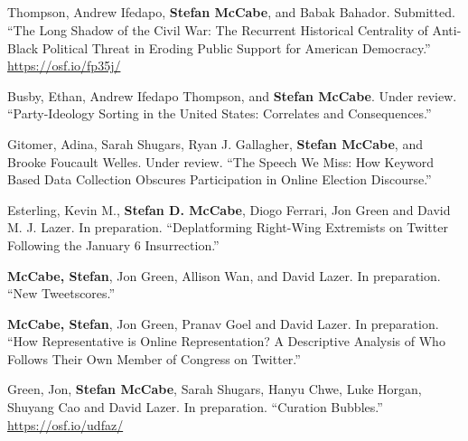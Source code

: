 \documentclass[11pt, letter]{article}
\begin{document}
\subsection*{} %
\vspace{-6mm} %
\begin{hangparas}{.25in}{1}

Thompson, Andrew Ifedapo, \textbf{Stefan McCabe}, and Babak Bahador.
Submitted. ``The Long Shadow of the Civil War: The Recurrent Historical Centrality of
Anti-Black Political Threat in Eroding Public Support for American Democracy.''
\href{https://osf.io/fp35j/}{https://osf.io/fp35j/} \vspace{2mm}

Busby, Ethan, Andrew Ifedapo Thompson, and \textbf{Stefan McCabe}. Under review.
``Party-Ideology Sorting in the United States: Correlates and Consequences.'' \vspace{2mm}

Gitomer, Adina, Sarah Shugars, Ryan J. Gallagher, \textbf{Stefan McCabe}, and
Brooke Foucault Welles. Under review. ``The Speech We Miss: How Keyword Based
Data Collection Obscures Participation in Online Election Discourse.'' \vspace{2mm}

Esterling, Kevin M.,\textsuperscript{\textdagger} \textbf{Stefan D.
McCabe},\textsuperscript{\textdagger} Diogo Ferrari, Jon Green and David M. J.
Lazer. In preparation. ``Deplatforming Right-Wing Extremists on Twitter
Following the January 6 Insurrection.''\vspace{2mm}

\textbf{McCabe, Stefan}, Jon Green, Allison Wan, and David Lazer. In
preparation. ``New Tweetscores.''\vspace{2mm}

\textbf{McCabe, Stefan}, Jon Green, Pranav Goel and David Lazer. In preparation.
``How Representative is Online Representation? A Descriptive Analysis of Who
Follows Their Own Member of Congress on Twitter.''\vspace{2mm}

Green, Jon,\textsuperscript{\textdagger} \textbf{Stefan
  McCabe},\textsuperscript{\textdagger} Sarah Shugars, Hanyu
Chwe, Luke Horgan, Shuyang Cao and David Lazer. In preparation. ``Curation
Bubbles.'' \href{https://osf.io/udfaz/}{https://osf.io/udfaz/} \vspace{2mm}


\end{hangparas}
\end{document}
